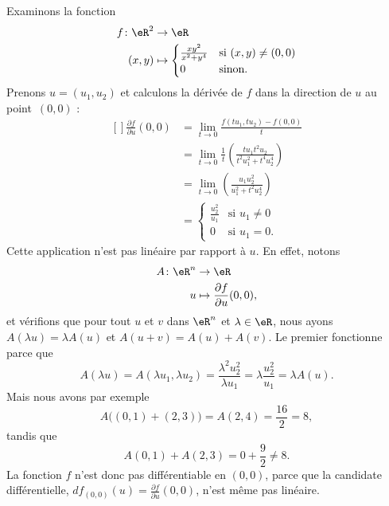\begin{example}     \label{Exemple0046Diff}
Examinons la fonction
\begin{equation}
    \begin{aligned}
        f\colon \eR^2&\to \eR \\
        (x,y)&\mapsto \begin{cases}
    \frac{ xy^2 }{ x^2+y^4 }    &   \text{si }(x,y)\neq (0,0)\\
    0   &    \text{sinon}.
\end{cases}
    \end{aligned}
\end{equation}
Prenons $u=(u_1,u_2)$ et calculons la dérivée de $f$ dans la direction de $u$ au point~$(0,0)$ :
\begin{equation}
    \begin{aligned}[]
        \frac{ \partial f }{ \partial u }(0,0)
            &=\lim_{t\to 0}\frac{ f(tu_1,tu_2)-f(0,0) }{ t }\\
            &=\lim_{t\to 0}\frac{1}{ t }\left( \frac{ tu_1t^2u_2 }{ t^2u_1^2+t^4u_2^4 } \right)\\
            &=\lim_{t\to 0}\left( \frac{ u_1u_2^2 }{ u_1^2+t^2u_2^4 } \right)\\
            &=\begin{cases}
    \frac{ u_2^2 }{ u_1 }   &   \text{si }u_1\neq 0\\
    0   &    \text{si }u_1=0.
\end{cases}
    \end{aligned}
\end{equation}
Cette application n'est pas linéaire par rapport à $u$. En effet, notons
\begin{equation}
    \begin{aligned}
        A\colon \eR^n&\to \eR \\
        u&\mapsto \frac{ \partial f }{ \partial u }(0,0),
    \end{aligned}
\end{equation}
et vérifions que pour tout $u$ et $v$ dans $\eR^n$ et $\lambda\in\eR$, nous ayons $A(\lambda u)=\lambda A(u)$ et $A(u+v)=A(u)+A(v)$. Le premier fonctionne parce que
\begin{equation}
    A(\lambda u)=A(\lambda u_1,\lambda u_2)=\frac{ \lambda^2 u_2^2 }{ \lambda u_1 }=\lambda\frac{ u_2^2 }{ u_1 }=\lambda A(u).
\end{equation}
Mais nous avons par exemple
\begin{equation}
    A\big( (0,1)+(2,3) \big)=A(2,4)=\frac{ 16 }{ 2 }=8,
\end{equation}
tandis que
\begin{equation}
    A(0,1)+A(2,3)=0+\frac{ 9 }{ 2 }\neq 8.
\end{equation}
La fonction $f$ n'est donc pas différentiable en $(0,0)$, parce que la candidate différentielle, $df_{(0,0)}(u)=\frac{ \partial f }{ \partial u }(0,0)$, n'est même pas linéaire.

\end{example}

